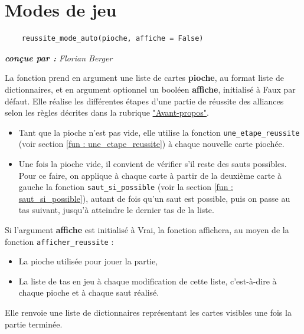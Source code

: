 \documentclass[titlepage]{article}
\begin{document}
\newpage \section{Modes de jeu}
\label{sec : modes_jeu}

\noindent	\begin{minipage}{\textwidth}
	\begin{lstlisting}
	reussite_mode_auto(pioche, affiche = False)
	\end{lstlisting}	
	\end{minipage}

\emph{\textbf{conçue par : } Florian Berger} \vspace{2mm}\par
La fonction prend en argument une liste de cartes \textbf{pioche}, au format liste de dictionnaires, et en argument optionnel un booléen \textbf{affiche}, initialisé à Faux par défaut. Elle réalise les différentes étapes d'une partie de réussite des alliances selon les règles décrites dans la rubrique \hyperlink{avant-propos}{"Avant-propos"}.
	\begin{itemize}
	\item Tant que la pioche n'est pas vide, elle utilise la fonction \texttt{une\_etape\_reussite} (voir section \ref{fun : une_etape_reussite}) à chaque nouvelle carte piochée.
	\item Une fois la pioche vide, il convient de vérifier s'il reste des sauts possibles. Pour ce faire, on applique à chaque carte à partir de la deuxième carte à gauche la fonction \texttt{saut\_si\_possible} (voir la section \ref{fun : saut_si_possible}), autant de fois qu'un saut est possible, puis on passe au tas suivant, jusqu'à atteindre le dernier tas de la liste.
	\end{itemize}\par
Si l'argument \textbf{affiche} est initialisé à Vrai, la fonction affichera, au moyen de la fonction \texttt{afficher\_reussite} :
	\begin{itemize}
	\item La pioche utilisée pour jouer la partie,
	\item La liste de tas en jeu à chaque modification de cette liste, c'est-à-dire à chaque pioche et à chaque saut réalisé.
	\end{itemize}
\par
Elle renvoie une liste de dictionnaires représentant les cartes visibles une fois la partie terminée.
\vspace{5mm}
\end{document}
